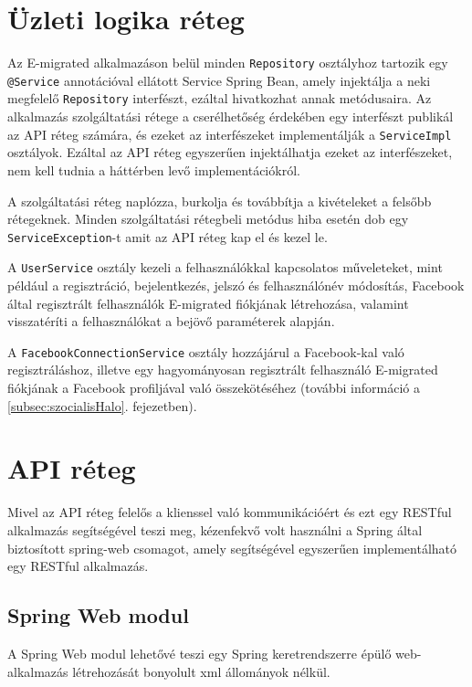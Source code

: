 \begin{reviewed}
\section{Üzleti logika réteg}
\label{subsec:szolgaltatas}
Az E-migrated alkalmazáson belül minden \texttt{Repository} osztályhoz tartozik egy \texttt{@Service} annotációval ellátott Service Spring Bean, amely injektálja a neki megfelelő \texttt{Repository} interfészt, ezáltal hivatkozhat annak metódusaira. Az alkalmazás szolgáltatási rétege a cserélhetőség érdekében egy interfészt publikál az API réteg számára, és ezeket az interfészeket implementálják a \texttt{ServiceImpl} osztályok. Ezáltal az API réteg egyszerűen injektálhatja ezeket az interfészeket, nem kell tudnia a háttérben levő implementációkról. 

A szolgáltatási réteg naplózza, burkolja és továbbítja a kivételeket a felsőbb rétegeknek. Minden szolgáltatási rétegbeli metódus hiba esetén dob egy \texttt{ServiceException}-t amit az API réteg kap el és kezel le.

A \texttt{UserService} osztály kezeli a felhasználókkal kapcsolatos műveleteket, mint például a regisztráció, bejelentkezés, jelszó és felhasználónév módosítás, Facebook által regisztrált felhasználók E-migrated fiókjának létrehozása, valamint visszatéríti a felhasználókat a bejövő paraméterek alapján. 

A \texttt{FacebookConnectionService} osztály hozzájárul a Facebook-kal való regisztráláshoz, illetve egy hagyományosan regisztrált felhasználó E-migrated fiókjának a Facebook profiljával való összekötéséhez (további információ a  \ref{subsec:szocialisHalo}. fejezetben).


\section{API réteg}
\label{subsec:API}

Mivel az API réteg felelős a klienssel való kommunikációért és ezt egy RESTful alkalmazás segítségével teszi meg, kézenfekvő volt használni a Spring által biztosított spring-web csomagot, amely segítségével egyszerűen implementálható egy RESTful alkalmazás. 
\end{reviewed}
\subsection{Spring Web modul}\label{subsubsec:SpringWeb}
A Spring Web modul lehetővé teszi egy Spring keretrendszerre épülő web-alkalmazás létrehozását bonyolult xml állományok nélkül. 

